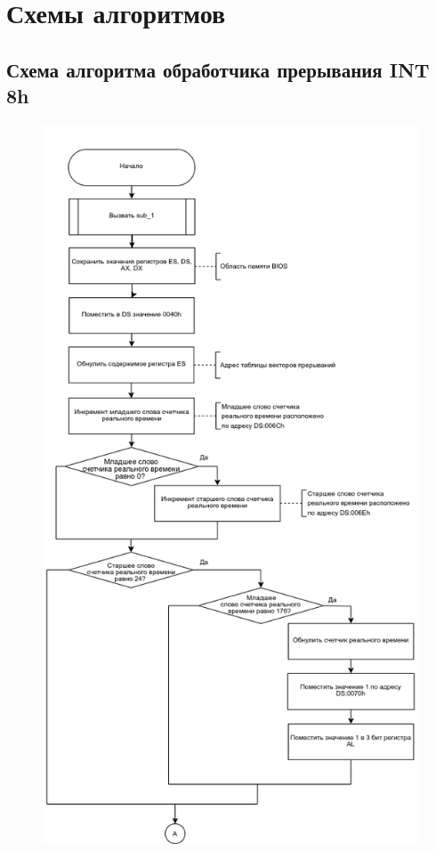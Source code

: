 \documentclass[a4paper, 12pt]{extreport}
\begin{document}
	\chapter{Схемы алгоритмов}
	\section{Схема алгоритма обработчика прерывания INT 8h}
	\begin{figure}[H]
		\centering
		\includegraphics[width=0.7\linewidth]{Int_8h_part1.png}
	\end{figure}
\end{document}
